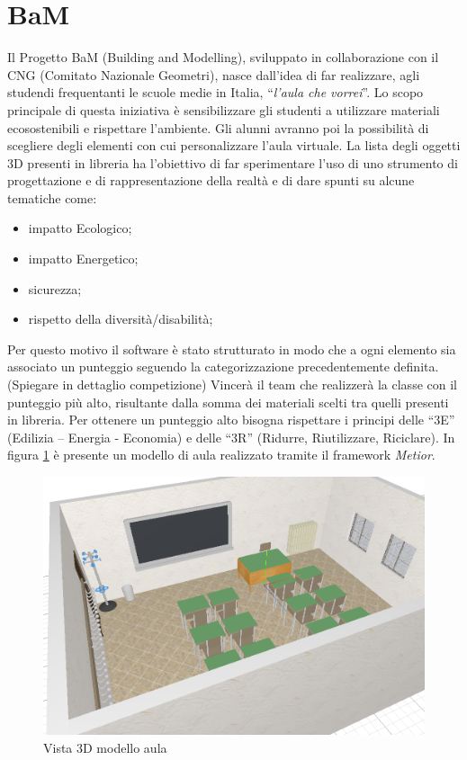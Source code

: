 \section{BaM}
\label{sec:chapter_4_section_1}
Il Progetto BaM (Building and Modelling), sviluppato in collaborazione con il CNG (Comitato Nazionale Geometri),
nasce dall'idea di far realizzare, agli studendi frequentanti le scuole medie in Italia,
``\emph{l'aula che vorrei}''. Lo scopo principale di questa iniziativa è sensibilizzare gli studenti a utilizzare
materiali ecosostenibili e rispettare l'ambiente.
Gli alunni avranno poi la possibilità di scegliere degli elementi con cui personalizzare l’aula virtuale.
La lista degli oggetti 3D presenti in libreria ha l’obiettivo di far sperimentare l’uso di uno strumento di progettazione
e di rappresentazione della realtà e di dare spunti su alcune tematiche come:
\begin{itemize}
\item impatto Ecologico;
\item impatto Energetico;
\item sicurezza;
\item rispetto della diversità/disabilità;
\end{itemize}
Per questo motivo il software è stato strutturato in modo che a ogni elemento sia associato un punteggio seguendo la
categorizzazione precedentemente definita.
(Spiegare in dettaglio competizione)
Vincerà il team che realizzerà la classe con il punteggio più alto, risultante dalla somma dei materiali scelti
tra quelli presenti in libreria. Per ottenere un punteggio alto bisogna rispettare i principi delle
“3E” (Edilizia – Energia - Economia) e delle “3R” (Ridurre, Riutilizzare, Riciclare). In figura \ref{fig:3daula} è presente
un modello di aula realizzato tramite il framework \emph{Metior}.\\
\begin{figure}[htbp] %
   \centering
   \includegraphics[width=1\linewidth]{images/3d-school-2}
   \caption{Vista 3D modello aula}
   \label{fig:3daula}
   \end{figure}

